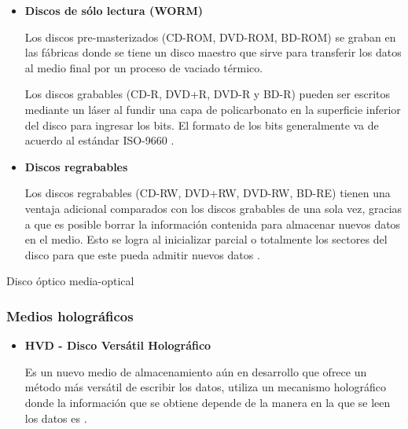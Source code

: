 \begin{itemize}

  \item \textbf{Discos de s\'{o}lo lectura (WORM)}

Los discos pre-masterizados (\textsc{CD-ROM}, \textsc{DVD-ROM}, \textsc{BD-ROM}) se graban en las f\'{a}bricas donde se tiene un disco maestro que sirve para transferir los datos al medio final por un proceso de vaciado t\'{e}rmico.

Los discos grabables (\textsc{CD-R}, \textsc{DVD+R}, \textsc{DVD-R} y \textsc{BD-R}) pueden ser escritos mediante un l\'{a}ser al fundir una capa de policarbonato en la superficie inferior del disco para ingresar los bits. El formato de los bits generalmente va de acuerdo al est\'{a}ndar \textsc{ISO-9660} \cite{_further_????}.

\newpage
  \item \textbf{Discos regrabables}

Los discos regrabables (\textsc{CD-RW}, \textsc{DVD+RW}, \textsc{DVD-RW}, \textsc{BD-RE}) tienen una ventaja adicional comparados con los discos grabables de una sola vez, gracias a que es posible borrar la informaci\'{o}n contenida para almacenar nuevos datos en el medio. Esto se logra al inicializar parcial o totalmente los sectores del disco para que este pueda admitir nuevos datos \cite{_odd_????}.

\end{itemize}

\diagramblock
{Disco \'{o}ptico}
{media-optical}
{
 {
  
 }
}

      \subsubsection*{Medios hologr\'{a}ficos }

\begin{itemize}

  \item \textbf{HVD - Disco Vers\'{a}til Hologr\'{a}fico}

Es un nuevo medio de almacenamiento a\'{u}n en desarrollo que ofrece un m\'{e}todo m\'{a}s vers\'{a}til de escribir los datos, utiliza un mecanismo hologr\'{a}fico donde la informaci\'{o}n que se obtiene depende de la manera en la que se leen los datos es \cite{_worlds_2004}.

\end{itemize}

\newpage
